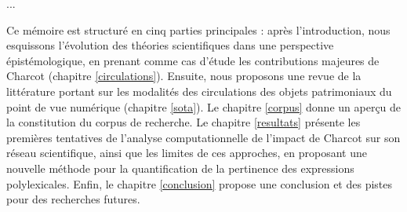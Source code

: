 ...

Ce mémoire est structuré en cinq parties principales : après l'introduction, nous esquissons l'évolution des théories scientifiques dans une perspective épistémologique, en prenant comme cas d'étude les contributions majeures de Charcot (chapitre \ref{circulations}).
Ensuite, nous proposons une revue de la littérature portant sur les modalités des circulations des objets patrimoniaux du point de vue numérique (chapitre \ref{sota}). Le chapitre \ref{corpus} donne un aperçu de la constitution du corpus de recherche. Le chapitre \ref{resultats} présente les premières tentatives de l'analyse computationnelle de l'impact de Charcot sur son réseau scientifique, ainsi que les limites de ces approches, en proposant une nouvelle méthode pour la quantification de la pertinence des expressions polylexicales. Enfin, le chapitre \ref{conclusion} propose une conclusion et des pistes pour des recherches futures.





